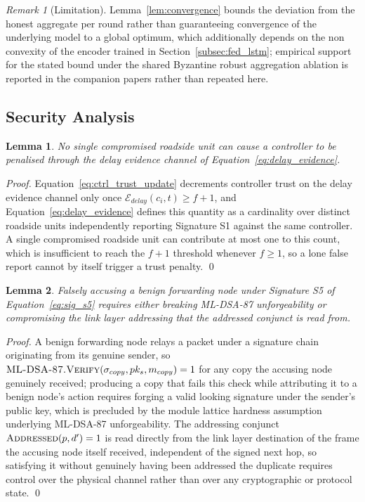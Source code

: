 \documentclass[lettersize,journal]{IEEEtran}
\theoremstyle{plain}
\newtheorem{lemma}{Lemma}
\theoremstyle{remark}
\newtheorem{remark}{Remark}
\begin{document}
	\begin{remark}[Limitation]
		Lemma~\ref{lem:convergence} bounds the deviation from the honest
		aggregate per round rather than guaranteeing convergence of the
		underlying model to a global optimum, which additionally depends
		on the non convexity of the encoder trained in
		Section~\ref{subsec:fed_lstm}; empirical support for the stated
		bound under the shared Byzantine robust aggregation ablation is
		reported in the companion papers rather than repeated here.
	\end{remark}
	
	
	\subsection{Security Analysis}\label{app:security}
	
	\begin{lemma}
		\label{lem:delay_evidence_bft}
		No single compromised roadside unit can cause a controller to be
		penalised through the delay evidence channel of
		Equation~\eqref{eq:delay_evidence}.
	\end{lemma}
	\begin{proof}
		Equation~\eqref{eq:ctrl_trust_update} decrements controller trust
		on the delay evidence channel only once
		$\mathcal{E}_{delay}(c_i,t) \geq f{+}1$, and
		Equation~\eqref{eq:delay_evidence} defines this quantity as a
		cardinality over distinct roadside units independently reporting
		Signature S1 against the same controller. A single compromised
		roadside unit can contribute at most one to this count, which is
		insufficient to reach the $f{+}1$ threshold whenever $f \geq 1$,
		so a lone false report cannot by itself trigger a trust penalty.
		\qed
	\end{proof}
	
	\begin{lemma}
		\label{lem:s5_unforgeability}
		Falsely accusing a benign forwarding node under Signature S5 of
		Equation~\eqref{eq:sig_s5} requires either breaking ML-DSA-87
		unforgeability or compromising the link layer addressing that the
		addressed conjunct is read from.
	\end{lemma}
	\begin{proof}
		A benign forwarding node relays a packet under a signature chain
		originating from its genuine sender, so
		$\textsc{ML-DSA-87.Verify}(\sigma_{copy},pk_s,m_{copy})=1$ for any
		copy the accusing node genuinely received; producing a copy that
		fails this check while attributing it to a benign node's action
		requires forging a valid looking signature under the sender's
		public key, which is precluded by the module lattice hardness
		assumption underlying ML-DSA-87 unforgeability. The addressing
		conjunct $\textsc{Addressed}(p,d')=1$ is read directly from the
		link layer destination of the frame the accusing node itself
		received, independent of the signed next hop, so satisfying it
		without genuinely having been addressed the duplicate requires
		control over the physical channel rather than over any
		cryptographic or protocol state.
		\qed
	\end{proof}
	
\end{document}
